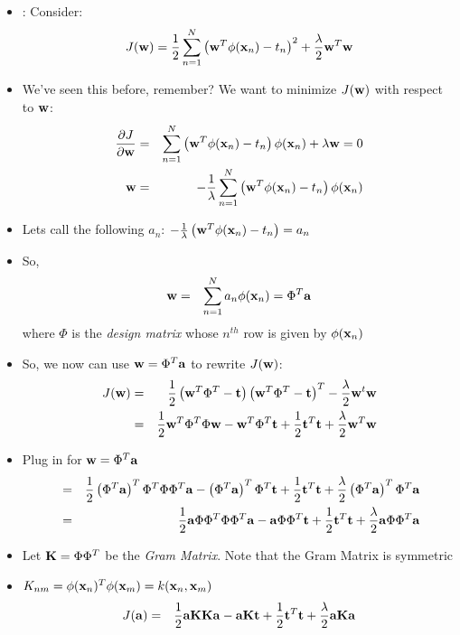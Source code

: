 \documentclass[12pt,letterpaper]{article}
\begin{document}
\begin{itemize}
\item: Consider:
\begin{equation}
J(\mathbf{w}) = \frac{1}{2}\sum_{n=1}^N \left(\mathbf{w}^T\phi(\mathbf{x}_n) - t_n \right)^2 + \frac{\lambda}{2} \mathbf{w}^T\mathbf{w}
\end{equation}
\item We've seen this before, remember? We want to minimize $J(\mathbf{w})$ with respect to $\mathbf{w}$:
\begin{eqnarray}
\frac{\partial J}{\partial \mathbf{w}} &=& \sum_{n=1}^N \left( \mathbf{w}^T\phi(\mathbf{x}_n) - t_n\right)\phi(\mathbf{x}_n) + \lambda\mathbf{w} = 0\\
\mathbf{w} &=& -\frac{1}{\lambda}\sum_{n=1}^N \left( \mathbf{w}^T\phi(\mathbf{x}_n) - t_n \right)\phi(\mathbf{x}_n)
\end{eqnarray}
\item Lets call the following $a_n$: $-\frac{1}{\lambda}\left( \mathbf{w}^T\phi(\mathbf{x}_n) - t_n \right) = a_n$
\item So, 
\begin{eqnarray}
\mathbf{w} &=& \sum_{n=1}^Na_n\phi(\mathbf{x}_n) = \Phi^T\mathbf{a}
\end{eqnarray}
where $\Phi$ is the \emph{design matrix} whose $n^{th}$ row is given by $\phi(\mathbf{x}_n)$
\item So, we now can use $\mathbf{w} = \Phi^T\mathbf{a}$ to rewrite $J(\mathbf{w})$:
\begin{eqnarray}
J(\mathbf{w}) &=& \frac{1}{2}\left( \mathbf{w}^T\Phi^T - \mathbf{t}\right)\left( \mathbf{w}^T\Phi^T - \mathbf{t}\right)^T - \frac{\lambda}{2}\mathbf{w}^t\mathbf{w}\\
&=& \frac{1}{2}\mathbf{w}^T\Phi^T\Phi\mathbf{w} - \mathbf{w}^T\Phi^T\mathbf{t} + \frac{1}{2}\mathbf{t}^T\mathbf{t} + \frac{\lambda}{2}\mathbf{w}^T\mathbf{w}
\end{eqnarray}
\item Plug in for $\mathbf{w} = \Phi^T\mathbf{a}$
\begin{eqnarray}
&=& \frac{1}{2}\left(\Phi^T\mathbf{a}\right)^T\Phi^T\Phi\Phi^T\mathbf{a} - \left(\Phi^T\mathbf{a}\right)^T\Phi^T\mathbf{t} + \frac{1}{2}\mathbf{t}^T\mathbf{t} + \frac{\lambda}{2}\left(\Phi^T\mathbf{a}\right)^T\Phi^T\mathbf{a}\\
&=& \frac{1}{2}\mathbf{a}\Phi\Phi^T\Phi\Phi^T\mathbf{a} - \mathbf{a}\Phi\Phi^T\mathbf{t} + \frac{1}{2}\mathbf{t}^T\mathbf{t} + \frac{\lambda}{2}\mathbf{a}\Phi\Phi^T\mathbf{a}
\end{eqnarray}
\item Let $\mathbf{K} = \Phi\Phi^T$ be the \emph{Gram Matrix}.  Note that the Gram Matrix is symmetric
\item $K_{nm} = \phi(\mathbf{x}_n)^T\phi(\mathbf{x}_m) = k(\mathbf{x}_n,\mathbf{x}_m)$
\begin{eqnarray}
J(\mathbf{a}) &=& \frac{1}{2}\mathbf{a}\K\K\mathbf{a} - \mathbf{a}\K\t + \frac{1}{2}\t^T\t + \frac{\lambda}{2}\mathbf{a}\K\mathbf{a}\\

\end{eqnarray}
\end{itemize}
\end{document}
